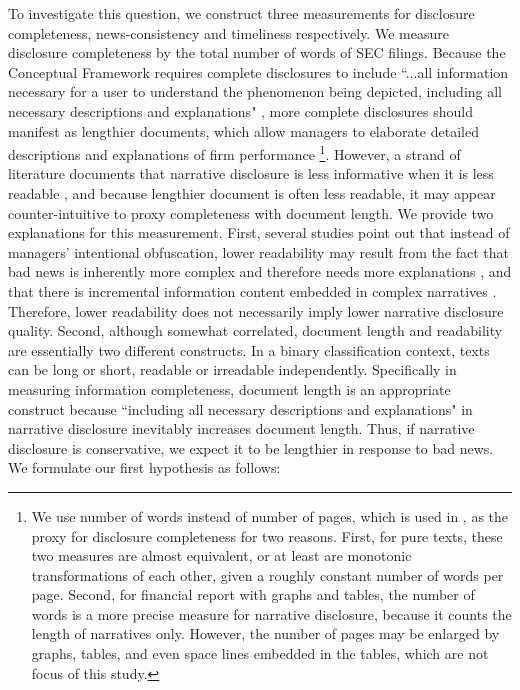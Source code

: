 \documentclass[a4paper]{article}
\begin{document}
\begin{spacing}{2}
To investigate this question, we construct three measurements for disclosure completeness, news-consistency and timeliness respectively. We measure disclosure completeness by the total number of words of SEC filings. Because the Conceptual Framework requires complete disclosures to include ``...all information necessary for a user to understand the phenomenon being depicted, including all necessary descriptions and explanations" \citep*[QC12]{fasbConceptualFrameworkFinancial2018}, more complete disclosures should manifest as lengthier documents, which allow managers to elaborate detailed descriptions and explanations of firm performance \citep{leuzDisclosureCostCapital2009}\footnote{We use number of words instead of number of pages, which is used in \citet{leuzDisclosureCostCapital2009}, as the proxy for disclosure completeness for two reasons. First, for pure texts, these two measures are almost equivalent, or at least are monotonic transformations of each other, given a roughly constant number of words per page. Second, for financial report with graphs and tables, the number of words is a more precise measure for narrative disclosure, because it counts the length of narratives only. However, the number of pages may be enlarged by graphs, tables, and even space lines embedded in the tables, which are not focus of this study.}. However, a strand of literature documents that narrative disclosure is less informative when it is less readable \citep*{liAnnualReportReadability2008, loEarningsManagementAnnual2017, loughranMeasuringReadabilityFinancial2014}, and because lengthier document is often less readable, it may appear counter-intuitive to proxy completeness with document length. We provide two explanations for this measurement. First, several studies point out that instead of managers' intentional obfuscation, lower readability may result from the fact that bad news is inherently more complex and therefore needs more explanations \citep*{bloomfieldDiscussionAnnualReport2008}, and that there is incremental information content embedded in complex narratives \citep*{busheeLinguisticComplexityFirm2018}. Therefore, lower readability does not necessarily imply lower narrative disclosure quality. Second, although somewhat correlated, document length and readability are essentially two different constructs. In a binary classification context, texts can be long or short, readable or irreadable independently. Specifically in measuring information completeness, document length is an appropriate construct because ``including all necessary descriptions and explanations" \citep*[QC12]{fasbConceptualFrameworkFinancial2018} in narrative disclosure inevitably increases document length. Thus, if narrative disclosure is conservative, we expect it to be lengthier in response to bad news. We formulate our first hypothesis as follows:


\end{spacing}
\end{document}
